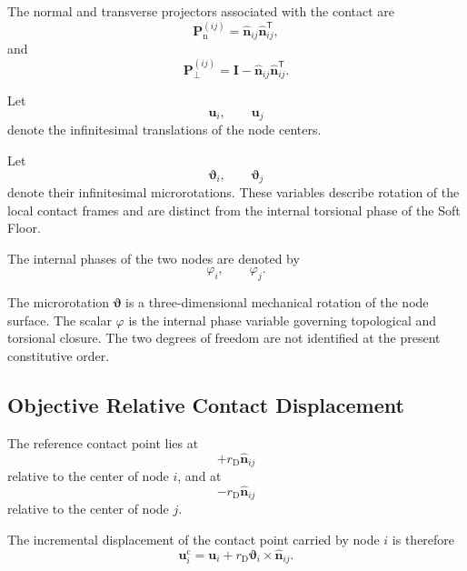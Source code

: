 The normal and transverse projectors associated with the contact are
\begin{equation}
    \mathbf{P}_{\mathrm{n}}^{(ij)} = \hat{\mathbf{n}}_{ij} \hat{\mathbf{n}}_{ij}^{\mathsf{T}},
\end{equation}
and
\begin{equation}
    \boxed{ \mathbf{P}_{\perp}^{(ij)} = \mathbf{I} - \hat{\mathbf{n}}_{ij} \hat{\mathbf{n}}_{ij}^{\mathsf{T}} }.
\end{equation}

Let
\begin{equation}
    \mathbf{u}_i, \qquad \mathbf{u}_j
\end{equation}
denote the infinitesimal translations of the node centers.

Let
\begin{equation}
    \boldsymbol{\vartheta}_i, \qquad \boldsymbol{\vartheta}_j
\end{equation}
denote their infinitesimal microrotations. These variables describe rotation of the local contact frames and are distinct from the internal torsional phase of the Soft Floor.

The internal phases of the two nodes are denoted by
\begin{equation}
    \varphi_i, \qquad \varphi_j.
\end{equation}

The microrotation $\boldsymbol{\vartheta}$ is a three-dimensional mechanical rotation of the node surface. The scalar $\varphi$ is the internal phase variable governing topological and torsional closure. The two degrees of freedom are not identified at the present constitutive order.

\subsection{Objective Relative Contact Displacement}

The reference contact point lies at
\begin{equation}
    +r_{\mathrm{D}}\hat{\mathbf{n}}_{ij}
\end{equation}
relative to the center of node $i$, and at
\begin{equation}
    -r_{\mathrm{D}}\hat{\mathbf{n}}_{ij}
\end{equation}
relative to the center of node $j$.

The incremental displacement of the contact point carried by node $i$ is therefore
\begin{equation}
    \mathbf{u}_i^{\mathrm{c}} = \mathbf{u}_i + r_{\mathrm{D}} \boldsymbol{\vartheta}_i \times \hat{\mathbf{n}}_{ij}.
\end{equation}

